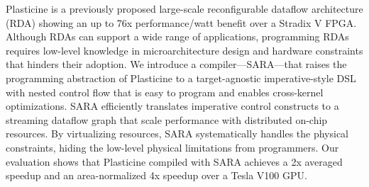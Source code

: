 Plasticine is a previously proposed large-scale reconfigurable dataflow architecture (RDA) showing an up to 76x performance/watt benefit over a Stradix V FPGA.
Although RDAs can support a wide range of applications, programming RDAs requires low-level knowledge in microarchitecture design and hardware constraints that hinders their adoption.
We introduce a compiler---SARA---that raises the programming abstraction of Plasticine to a target-agnostic imperative-style DSL with nested control flow that is easy to program and enables cross-kernel optimizations.
SARA efficiently translates imperative control constructs to a streaming
dataflow graph that scale performance with distributed on-chip resources.
By virtualizing resources, SARA systematically handles the physical constraints, hiding the low-level physical limitations from programmers.
Our evaluation shows that Plasticine compiled with SARA achieves a 2x averaged speedup and an area-normalized 4x speedup over a Tesla V100 GPU.

